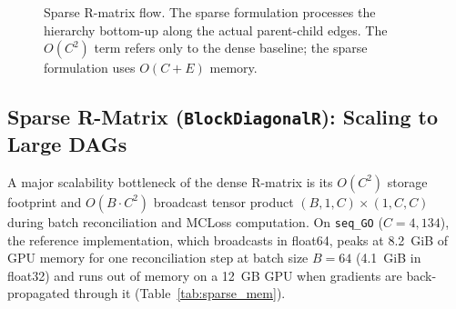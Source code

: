 \documentclass[preprint,12pt]{elsarticle}
\begin{document}
\begin{figure}[t]
\centering
{}
\caption{Sparse R-matrix flow. The sparse formulation processes the hierarchy bottom-up along the actual parent-child edges. The $O(C^2)$ term refers only to the dense baseline; the sparse formulation uses $O(C+E)$ memory.}
\label{fig:sparse_flow}
\end{figure}

\subsection{Sparse R-Matrix (\texttt{BlockDiagonalR}): Scaling to Large DAGs}
\label{sec:sparse}

A major scalability bottleneck of the dense R-matrix is its $O(C^2)$ storage
footprint and $O(B \cdot C^2)$ broadcast tensor product $(B, 1, C) \times
(1, C, C)$ during batch reconciliation and MCLoss computation. On
\texttt{seq\_GO} ($C{=}4{,}134$), the reference implementation, which
broadcasts in float64, peaks at 8.2~GiB of GPU memory for one reconciliation
step at batch size $B{=}64$ (4.1~GiB in float32) and runs out of memory on a
12~GB GPU when gradients are back-propagated through it
(Table~\ref{tab:sparse_mem}).
\end{document}
